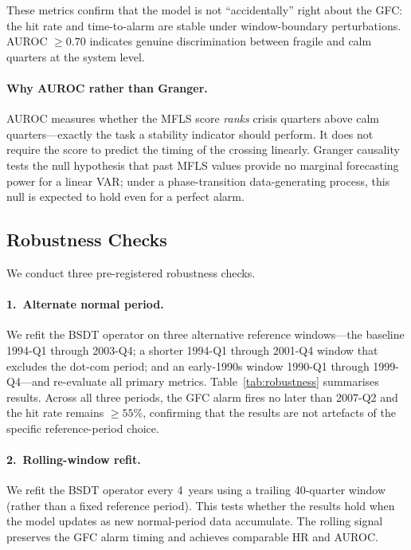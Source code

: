 \documentclass[11pt]{article}
\theoremstyle{definition}
\begin{document}
\noindent These metrics confirm that the model is not ``accidentally'' right about
the GFC: the hit rate and time-to-alarm are stable under window-boundary
perturbations.  AUROC $\geq 0.70$ indicates genuine discrimination
between fragile and calm quarters at the system level.

\paragraph{Why AUROC rather than Granger.}
AUROC measures whether the MFLS score \emph{ranks} crisis quarters above calm
quarters---exactly the task a stability indicator should perform.  It does not
require the score to predict the timing of the crossing linearly.
Granger causality tests the null hypothesis that past MFLS values provide
no marginal forecasting power for a linear VAR; under a phase-transition
data-generating process, this null is expected to hold even for a perfect alarm.

\subsection{Robustness Checks}
\label{sec:robust}

We conduct three pre-registered robustness checks.

\paragraph{1.\ Alternate normal period.}
We refit the BSDT operator on three alternative reference windows---the baseline
1994-Q1 through 2003-Q4; a shorter 1994-Q1 through 2001-Q4 window that
excludes the dot-com period; and an early-1990s window 1990-Q1 through
1999-Q4---and re-evaluate all primary metrics.  Table~\ref{tab:robustness}
summarises results.  Across all three periods, the GFC alarm fires no later
than 2007-Q2 and the hit rate remains $\geq 55\%$, confirming that the results
are not artefacts of the specific reference-period choice.

\paragraph{2.\ Rolling-window refit.}
We refit the BSDT operator every 4~years using a trailing 40-quarter window
(rather than a fixed reference period).  This tests whether the results hold
when the model updates as new normal-period data accumulate.  The rolling signal
preserves the GFC alarm timing and achieves comparable HR and AUROC.
\end{document}
